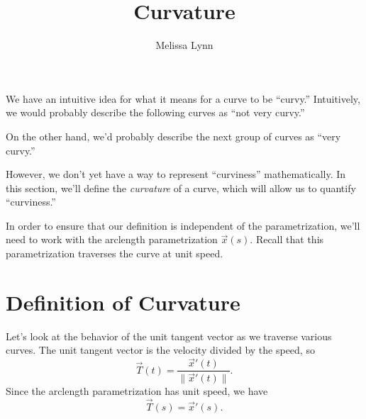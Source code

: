 \documentclass{ximera}
\title{Curvature}
\author{Melissa Lynn}
\begin{document}
\begin{abstract}
\end{abstract}
\maketitle

We have an intuitive idea for what it means for a curve to be ``curvy.'' Intuitively, we would probably describe the following curves as ``not very curvy.''

\begin{image}
\end{image}

On the other hand, we'd probably describe the next group of curves as ``very curvy.''

\begin{image}
\end{image}

However, we don't yet have a way to represent ``curviness'' mathematically. In this section, we'll define the \emph{curvature} of a curve, which will allow us to quantify ``curviness.'' 

In order to ensure that our definition is independent of the parametrization, we'll need to work with the arclength parametrization $\vec{x}(s)$. Recall that this parametrization traverses the curve at unit speed.

\section*{Definition of Curvature}

Let's look at the behavior of the unit tangent vector as we traverse various curves. The unit tangent vector is the velocity divided by the speed, so
\[
\vec{T}(t) = \frac{\vec{x}'(t)}{\|\vec{x}'(t)\|}.
\]
Since the arclength parametrization has unit speed, we have
\[
\vec{T}(s) = \vec{x}'(s).
\]
\end{document}
